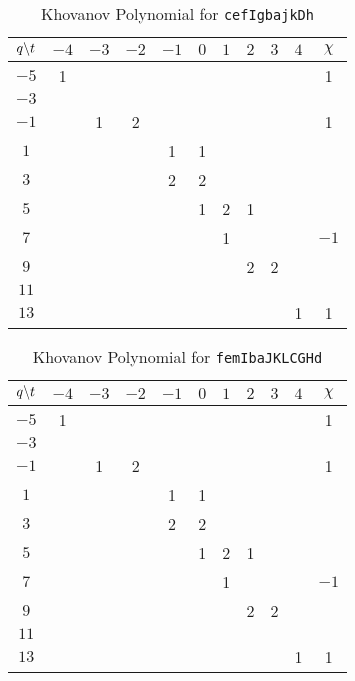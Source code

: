     \begin{table}
        \centering
        \begin{tabular}{| c | c | c | c | c | c | c | c | c | c | c |}
            \hline
            $q\symbol{92}t$&$-4$&$-3$&$-2$&$-1$&$0$&$1$&$2$&$3$&$4$&$\chi$\\
            \hline
            $-5$&1&&&&&&&&&1\\
            \hline
            $-3$&&&&&&&&&&\\
            \hline
            $-1$&&1&2&&&&&&&1\\
            \hline
            $1$&&&&1&1&&&&&\\
            \hline
            $3$&&&&2&2&&&&&\\
            \hline
            $5$&&&&&1&2&1&&&\\
            \hline
            $7$&&&&&&1&&&&$-1$\\
            \hline
            $9$&&&&&&&2&2&&\\
            \hline
            $11$&&&&&&&&&&\\
            \hline
            $13$&&&&&&&&&1&1\\
            \hline
        \end{tabular}
        \caption{Khovanov Polynomial for \texttt{cefIgbajkDh}}
        \label{table:cefIgbajkDh_kho}
    \end{table}
    \begin{table}
        \centering
        \begin{tabular}{| c | c | c | c | c | c | c | c | c | c | c |}
            \hline
            $q\symbol{92}t$&$-4$&$-3$&$-2$&$-1$&$0$&$1$&$2$&$3$&$4$&$\chi$\\
            \hline
            $-5$&1&&&&&&&&&1\\
            \hline
            $-3$&&&&&&&&&&\\
            \hline
            $-1$&&1&2&&&&&&&1\\
            \hline
            $1$&&&&1&1&&&&&\\
            \hline
            $3$&&&&2&2&&&&&\\
            \hline
            $5$&&&&&1&2&1&&&\\
            \hline
            $7$&&&&&&1&&&&$-1$\\
            \hline
            $9$&&&&&&&2&2&&\\
            \hline
            $11$&&&&&&&&&&\\
            \hline
            $13$&&&&&&&&&1&1\\
            \hline
        \end{tabular}
        \caption{Khovanov Polynomial for \texttt{femIbaJKLCGHd}}
        \label{table:femIbaJKLCGHd_kho}
    \end{table}
